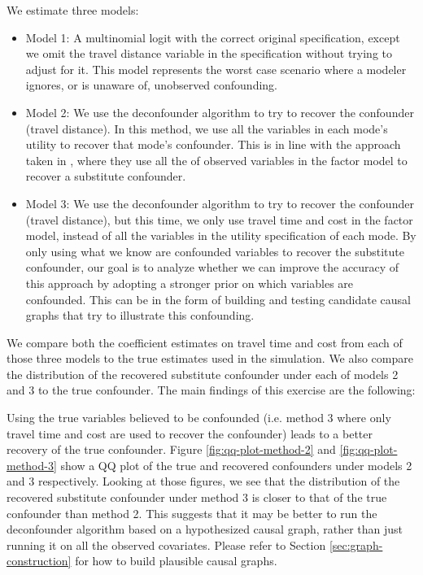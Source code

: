 We estimate three models:

\begin{itemize}
	\item Model 1: A multinomial logit with the correct original specification,
	except we omit the travel distance variable in the specification without
	trying to adjust for it. This model represents the worst case scenario
	where a modeler ignores, or is unaware of, unobserved confounding.
	\item Model 2: We use the deconfounder algorithm to try to recover the
	confounder (travel distance). In this method, we use all the variables in
	each mode's utility to recover that mode's confounder. This is in line
	with the approach taken in \citet{wang_2019_blessings}, where they use all the
	of observed variables in the factor model to recover a substitute
	confounder.
	\item Model 3: We use the deconfounder algorithm to try to recover the
	confounder (travel distance), but this time, we only use travel time and
	cost in the factor model, instead of all the variables in the utility
	specification of each mode. By only using what we know are confounded
	variables to recover the substitute confounder, our goal is to analyze
	whether we can improve the accuracy of this approach by adopting a stronger
	prior on which variables are confounded. This can
	be in the form of building and testing candidate causal graphs that
	try to illustrate this confounding.
\end{itemize}


We compare both the coefficient estimates on travel time and cost from
each of those three models to the true estimates used in the simulation.
We also compare the distribution of the recovered substitute confounder under each of
models 2 and 3 to the true confounder. The main findings of this exercise are the following:


Using the true variables believed to be confounded (i.e. method 3 where only
travel time and cost are used to recover the confounder) leads to a better
recovery of the true confounder. Figure \ref{fig:qq-plot-method-2} and \ref{fig:qq-plot-method-3} show a QQ plot of the true
and recovered confounders under models 2 and 3 respectively. Looking at those
figures, we see that the distribution of the recovered substitute
confounder under method 3 is closer to that of the true confounder than method
2. This suggests that it may be better to run the deconfounder algorithm based
on a hypothesized causal graph, rather than just running it on all the
observed covariates. Please refer to Section \ref{sec:graph-construction} for how to build plausible causal graphs.



